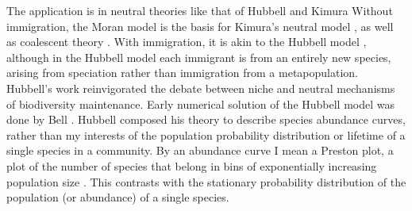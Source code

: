 The application is in neutral theories like that of Hubbell \cite{Hubbell2001} and Kimura \cite{Kimura1955,Crow1956}
Without immigration, the Moran model is the basis for Kimura's neutral model \cite{Kimura1955,Crow1956,Patwa2008,Houchmandzadeh2010}, as well as coalescent theory \cite{Kingman1982,Blythe2007,Etheridge2010}. 
With immigration, it is akin to the Hubbell model \cite{Bell2000,Hubbell2001}, although in the Hubbell model each immigrant is from an entirely new species, arising from speciation rather than immigration from a metapopulation. %
Hubbell's work reinvigorated the debate between niche and neutral mechanisms of biodiversity maintenance. 
Early numerical solution of the Hubbell model was done by Bell \cite{Bell2001}. %
Hubbell composed his theory to describe species abundance curves, rather than my interests of the population probability distribution or lifetime of a single species in a community. 
By an abundance curve I mean a Preston plot, a plot of the number of species that belong in bins of exponentially increasing population size \cite{Hubbell2001}. 
This contrasts with the stationary probability distribution of the population (or abundance) of a single species. 

